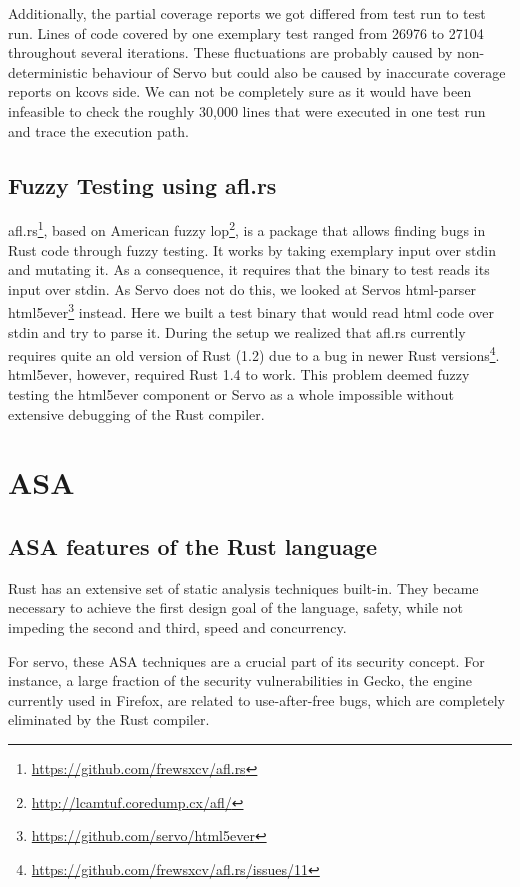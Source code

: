 \documentclass{scrartcl}
\begin{document}
Additionally, the partial coverage reports we got differed from test run to test run. Lines of code covered by one exemplary test ranged from 26976 to 27104 throughout several iterations. These fluctuations are probably caused by non-deterministic behaviour of Servo but could also be caused by inaccurate coverage reports on kcovs side. We can not be completely sure as it would have been infeasible to check the roughly 30,000 lines that were executed in one test run and trace the execution path.


\subsection{Fuzzy Testing using afl.rs}

afl.rs\footnote{\url{https://github.com/frewsxcv/afl.rs}}, based on American fuzzy lop\footnote{\url{http://lcamtuf.coredump.cx/afl/}}, is a package that allows finding bugs in Rust code through fuzzy testing. It works by taking exemplary input over stdin and mutating it. As a consequence, it requires that the binary to test reads its input over stdin. As Servo does not do this, we looked at Servos html-parser html5ever\footnote{\url{https://github.com/servo/html5ever}} instead. Here we built a test binary that would read html code over stdin and try to parse it. During the setup we realized that afl.rs currently requires quite an old version of Rust (1.2) due to a bug in newer Rust versions\footnote{\url{https://github.com/frewsxcv/afl.rs/issues/11}}. html5ever, however, required Rust 1.4 to work. This problem deemed fuzzy testing the html5ever component or Servo as a whole impossible without extensive debugging of the Rust compiler.




\section{ASA}


\subsection{ASA features of the Rust language} \label{rust_features}

Rust has an extensive set of static analysis techniques built-in. They became necessary to achieve the first design goal of the language, safety, while not impeding the second and third, speed and concurrency.

For servo, these ASA techniques are a crucial part of its security concept. For instance, a large fraction of the security vulnerabilities in Gecko, the engine currently used in Firefox, are related to use-after-free bugs, which are completely eliminated by the Rust compiler.
\end{document}
